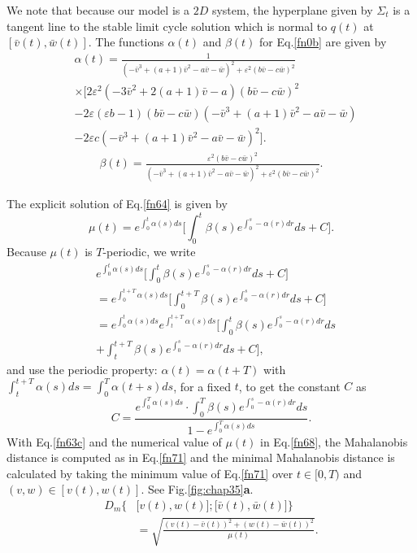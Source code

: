 We note that because our model is a $2D$ system, the hyperplane given by
$\varSigma_{t}$ is a tangent line to the stable limit cycle solution 
which is normal to $q(t)$ at
$[\bar{v}(t),\bar{w}(t)]$.
The functions $\alpha(t)$ and $\beta(t)$ for Eq.\eqref{fn0b} are given by
\begin{align} \label{fn66}\nonumber
&\alpha(t)=\frac{1}{(-\bar{v}^3+(a+1)\bar{v}^2-a\bar{v}-\bar{w})^2+\varepsilon^2(b\bar{v}-c\bar{w})^2}\\\nonumber
&\times\Bigg[2\varepsilon^2(-3\bar{v}^2+2(a+1)\bar{v}-a)(b\bar{v}-c\bar{w})^2\\\nonumber
&-2\varepsilon (\varepsilon b-1)(b\bar{v}-c\bar{w})(-\bar{v}^3+(a+1)\bar{v}^2-a\bar{v}-\bar{w})\\
&-2\varepsilon c(-\bar{v}^3+(a+1)\bar{v}^2-a\bar{v}-\bar{w})^2\Bigg].
\end{align}
\begin{align} \label{fn67}
\beta(t)=\frac{\varepsilon^2(b\bar{v}-c\bar{w})^2}{(-\bar{v}^3+(a+1)
\bar{v}^2-a\bar{v}-\bar{w})^2+\varepsilon^2(b\bar{v}-c\bar{w})^2}.
\end{align}

The explicit solution of Eq.\eqref{fn64} is given by
\begin{equation}\label{fn68}
\mu(t)=e^{\int_0^t\alpha(s)ds}\Bigg[\int_0^t \beta(s)e^{\int_0^s-\alpha(r)dr}ds+C\Bigg].
\end{equation}
Because $\mu(t)$ is $T$-periodic, we write
\begin{align} \label{fn69}\nonumber
&e^{\int_0^t\alpha(s)ds}\Bigg[\int_0^t
\beta(s)e^{\int_0^s-\alpha(r)dr}ds+C\Bigg]\\\nonumber
&=e^{\int_0^{t+T}\alpha(s)ds}\Bigg[\int_0^{t+T}
\beta(s)e^{\int_0^s-\alpha(r)dr}ds+C\Bigg]\\ \nonumber
&=e^{\int_0^{t}\alpha(s)ds}e^{\int_t^{t+T}\alpha(s)ds}
\Bigg[\int_0^{t}\beta(s)e^{\int_0^s-\alpha(r)dr}ds\\
&+\int_t^{t+T}\beta(s)e^{\int_0^s-\alpha(r)dr}ds+C \Bigg],
\end{align}
and use the periodic property: $\alpha(t)=\alpha(t+T)$
with $\int_t^{t+T}\alpha(s)ds=\int_0^T\alpha(t+s)ds$, for
a fixed $t$, to get the constant $C$ as \begin{equation}\label{fn70}
C=\frac{e^{\int_0^{T}\alpha(s)ds}\cdotp
\int_0^{T}\beta(s)e^{\int_0^s-\alpha(r)dr}ds}{1-e^{\int_0^{T}\alpha(s)ds}}.
\end{equation}
With Eq.\eqref{fn63c} and the numerical value of $\mu(t)$ in Eq.\eqref{fn68}, 
the Mahalanobis distance is computed as
in Eq.\eqref{fn71} and the minimal Mahalanobis distance is calculated by taking
the minimum value of Eq.\eqref{fn71} over
$t\in[0,T)$ and $(v,w)\in[v(t),w(t)]$. See Fig.\ref{fig:chap35}\textbf{a}.
\begin{align}\label{fn71}\nonumber
D_m\Big\{&\big[v(t),w(t)\big];\big[\bar{v}(t),\bar{w}(t)\big]\Big\}\\
&=\sqrt{\frac{(v(t)-\bar{v}(t))^2+(w(t)-\bar{w}(t))^2}{\mu(t)}}.
\end{align}

